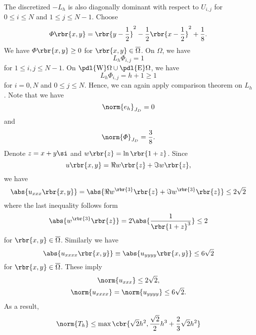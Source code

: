 \documentclass[english, nochinese]{pnote}
\begin{document}
The discretized $-L_h$ is also diagonally dominant with respect to $ U_{ i, j } $ for $ 0 \le i \le N $ and $ 1 \le j \le N - 1 $. Choose
\begin{equation}
\varPhi \rbr{ x, y } = \rbr{ y - \frac{1}{2} }^2 - \frac{1}{2} \rbr{ x - \frac{1}{2} }^2 + \frac{1}{8}.
\end{equation}
We have $ \varPhi \rbr{ x, y } \ge 0 $ for $ \rbr{ x, y } \in \overline{\Omega} $. On $\Omega$, we have
\begin{equation}
L_h \varPhi_{ i, j } = 1
\end{equation}
for $ 1 \le i, j \le N - 1 $. On $ \pdl{\text{W}} \Omega \cup \pdl{\text{E}} \Omega $, we have
\begin{equation}
L_h \varPhi_{ i, j } = h + 1 \ge 1
\end{equation}
for $ i = 0, N $ and $ 0 \le j \le N $. Hence, we can again apply comparison theorem on $L_h$. Note that we have
\begin{equation}
\norm{e_h}_{J_D} = 0
\end{equation}
and
\begin{equation}
\norm{\varPhi}_{J_D} = \frac{3}{8}.
\end{equation}
Denote $ z = x + y \si $ and $ w \rbr{z} = \ln \rbr{ 1 + z } $. Since
\begin{equation}
u \rbr{ x, y } = \Re w \rbr{z} + \Im w \rbr{z},
\end{equation}
we have
\begin{equation}
\abs{ u_{ x x x } \rbr{ x, y } } = \abs{ \Re w^{\rbr{3}} \rbr{z} + \Im w^{\rbr{3}} \rbr{z} } \le 2 \sqrt{2}
\end{equation}
where the last inequality follows form
\begin{equation}
\abs{ w^{\rbr{3}} \rbr{z} } = 2 \abs{\frac{1}{\rbr{ 1 + z }^3}} \le 2
\end{equation}
for $ \rbr{ x, y } \in \overline{\Omega} $. Similarly we have
\begin{equation}
\abs{ u_{ x x x x } \rbr{ x, y } } \equiv \abs{ u_{ y y y y } \rbr{ x, y } } \le 6 \sqrt{2}
\end{equation}
for $ \rbr{ x, y } \in \overline{\Omega} $. These imply
\begin{gather}
\norm{u_{ x x x }} \le 2 \sqrt{2}, \\
\norm{u_{ x x x x }} = \norm{u_{ y y y y }} \le 6 \sqrt{2}.
\end{gather}
As a result,
\begin{equation}
\norm{T_h} \le \max \cbr{ \sqrt{2} h^2, \frac{\sqrt{2}}{2} h^3 + \frac{2}{3} \sqrt{2} h^2 }
\end{equation}
\end{document}
